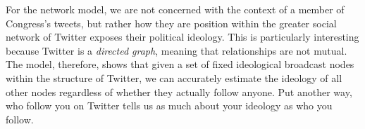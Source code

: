 \documentclass[10pt]{article}
\begin{document}
For the network model, we are not concerned with the context of a member of Congress's tweets, but rather how they are position within the greater social network of Twitter exposes their political ideology.  This is particularly interesting because Twitter is a \emph{directed graph}, meaning that relationships are not mutual.  The model, therefore, shows that given a set of fixed ideological broadcast nodes within the structure of Twitter, we can accurately estimate the ideology of all other nodes regardless of whether they actually follow anyone.  Put another way, who follow you on Twitter tells us as much about your ideology as who you follow.


\newpage
{}
 
\end{document}
